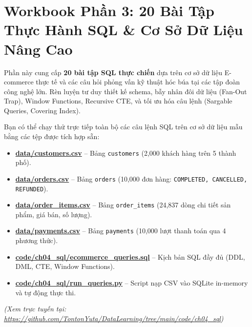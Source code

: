 \chapter{Workbook Phần 3: 20 Bài Tập Thực Hành SQL \& Cơ Sở Dữ Liệu Nâng Cao}

\begin{lythuyetbox}
Phần này cung cấp \textbf{20 bài tập SQL thực chiến} dựa trên cơ sở dữ liệu E-commerce thực tế và các câu hỏi phỏng vấn kỹ thuật hóc búa tại các tập đoàn công nghệ lớn. Rèn luyện tư duy thiết kế schema, bẫy nhân đôi dữ liệu (Fan-Out Trap), Window Functions, Recursive CTE, và tối ưu hóa câu lệnh (Sargable Queries, Covering Index).
\end{lythuyetbox}

\begin{thuchanhbox}
Bạn có thể chạy thử trực tiếp toàn bộ các câu lệnh SQL trên cơ sở dữ liệu mẫu bằng các tệp được tích hợp sẵn:
\begin{itemize}
    \item \href{run:./data/customers.csv}{\Large\textbf{\color{navyprimary}data/customers.csv}} -- Bảng \texttt{customers} (2,000 khách hàng trên 5 thành phố).
    \item \href{run:./data/orders.csv}{\Large\textbf{\color{navyprimary}data/orders.csv}} -- Bảng \texttt{orders} (10,000 đơn hàng: \texttt{COMPLETED, CANCELLED, REFUNDED}).
    \item \href{run:./data/order_items.csv}{\Large\textbf{\color{navyprimary}data/order\_items.csv}} -- Bảng \texttt{order\_items} (24,837 dòng chi tiết sản phẩm, giá bán, số lượng).
    \item \href{run:./data/payments.csv}{\Large\textbf{\color{navyprimary}data/payments.csv}} -- Bảng \texttt{payments} (10,000 lượt thanh toán qua 4 phương thức).
    \item \href{run:./code/ch04_sql/ecommerce_queries.sql}{\Large\textbf{\color{navyprimary}code/ch04\_sql/ecommerce\_queries.sql}} -- Kịch bản SQL đầy đủ (DDL, DML, CTE, Window Functions).
    \item \href{run:./code/ch04_sql/run_queries.py}{\Large\textbf{\color{navyprimary}code/ch04\_sql/run\_queries.py}} -- Script nạp CSV vào SQLite in-memory và tự động thực thi.
\end{itemize}
\small\textit{(Xem trực tuyến tại: \url{https://github.com/TontonYuta/DataLearning/tree/main/code/ch04_sql})}
\end{thuchanhbox}

